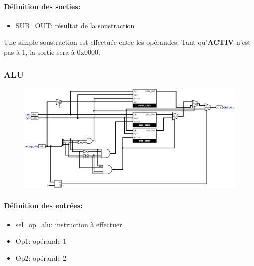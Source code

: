 \documentclass[a4paper]{article} %
\begin{document}
\paragraph{Définition des sorties:}
\begin{itemize}
    \item     SUB\_OUT: résultat de la soustraction
\end{itemize}
\medskip
Une simple soustraction est effectuée entre les opérandes. Tant qu'\textbf{ACTIV} n'est pas à 1, la sortie sera à 0x0000.

\subsubsection{ALU} \label{alu}
\begin{figure}[H]
    \centering
    \includegraphics[width=1\textwidth]{src/ALU.png}
    \label{fig:alu_pic}
\end{figure}
\paragraph{Définition des entrées:}
\begin{itemize}
    \item     sel\_op\_alu: instruction à effectuer
    \item     Op1: opérande 1
    \item     Op2: opérande 2
\end{itemize}
\end{document}

